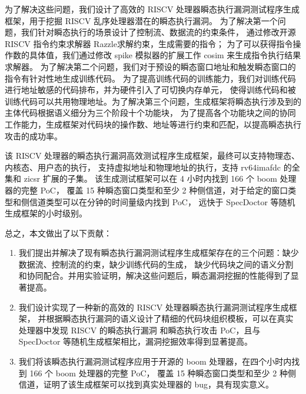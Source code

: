 为了解决这些问题，我们设计了高效的 RISCV 处理器瞬态执行漏洞测试程序生成框架，用于挖掘 RISCV 乱序处理器潜在的瞬态执行漏洞。
为了解决第一个问题，我们针对瞬态执行的场景设计了控制流、数据流的约束条件，
通过修改开源 RISCV 指令约束求解器 Razzle\cite{razzle}求解约束，生成需要的指令；
为了可以获得指令操作数的具体值，我们通过修改 spike 模拟器\cite{riscv-isa-sim}的扩展工作 cosim \cite{riscv-isa-cosim}
来生成指令执行结果求解器。
为了解决第二个问题，我们对于预设的瞬态窗口地址和触发瞬态窗口的指令有针对性地生成训练代码。
为了提高训练代码的训练能力，我们对训练代码进行地址敏感的代码排布，并为硬件引入了可切换内存单元，
使得训练代码和被训练代码可以共用物理地址。为了解决第三个问题，生成框架将瞬态执行涉及到的主体代码根据语义细分为三个阶段十个功能块，
为了提高各个功能块之间的协同工作能力，生成框架对代码块的操作数、地址等进行约束和匹配，以提高瞬态执行攻击的成功率。\par

该 RISCV 处理器的瞬态执行漏洞高效测试程序生成框架，最终可以支持物理态、内核态、用户态的执行，
支持虚拟地址和物理地址的执行，支持 rv64imafdc 的全集和 zicsr 扩展的子集\cite{riscv-isa-manual-all}。
该生成测试框架可以在 4 小时内找到 166 个 boom 处理器的完整 PoC，
覆盖 15 种瞬态窗口类型和至少 2 种侧信道，对于给定的窗口类型和侧信道类型可以在分钟的时间量级内找到 PoC，
远快于 SpecDoctor\cite{hur2022specdoctor} 等随机生成框架的小时级别。\par

总之，本文做出了以下贡献：\par

\begin{enumerate}
    \item 我们提出并解决了现有瞬态执行漏洞测试程序生成框架存在的三个问题：缺少数据流、控制流的约束，缺少训练代码的生成，
缺少代码块之间的语义分割和协同配合。并用实验证明，解决这些问题后，瞬态漏洞挖掘的性能得到了显著提高。\par
    \item 我们设计实现了一种新的高效的 RISCV 处理器瞬态执行漏洞测试程序生成框架，
并根据瞬态执行漏洞的语义设计了精细的代码块组织模板，可以在真实处理器中发现 RISCV 的瞬态执行漏洞
和瞬态执行攻击 PoC，且与 SpecDoctor 等随机生成框架相比，漏洞挖掘效率得到显著提高。\par
    \item 我们将该瞬态执行漏洞测试程序应用于开源的 boom 处理器，在四个小时内找到 166 个 boom 处理器的完整 PoC，
覆盖 15 种瞬态窗口类型和至少 2 种侧信道，证明了该生成框架可以找到真实处理器的 bug，具有现实意义。\par
\end{enumerate}


